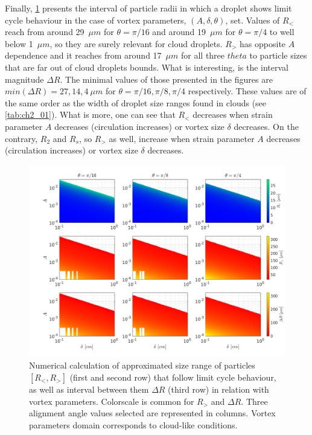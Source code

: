 \documentclass[../main.tex]{subfiles}
\begin{document}
Finally, \ref{fig:ch4_6} presents the interval of particle radii in which a droplet shows limit cycle behaviour in the case of vortex parameters, $(A, \delta, \theta)$, set. Values of $R_<$  reach from around 29~$\mu m$ for $\theta=\pi/16$ and around 19~$\mu m$ for $\theta=\pi/4$ to well below 1~$\mu m$, so they are surely relevant for cloud droplets. $R_>$ has opposite $A$ dependence and it reaches from around 17~$\mu m$ for all three $theta$ to particle sizes that are far out of cloud droplets bounds. What is interesting, is the interval magnitude $\Delta R$. The minimal values of those presented in the figures are $min(\Delta R)=27, 14, 4 \ \mu m$ for $\theta=\pi/16, \pi/8, \pi/4$ respectively. These values are of the same order as the width of droplet size ranges found in clouds (see \autoref{tab:ch2_01}). What is more, one can see that $R_<$ decreases when strain parameter $A$ decreases (circulation increases) or vortex size $\delta$ decreases. On the contrary, $R_2$ and $R_s$, so $R_>$ as well, increase when strain parameter $A$ decreases (circulation increases) or vortex size $\delta$ decreases.

\begin{figure}[h]
\centering
\noindent\includegraphics[width=35pc]{gfx/RlRrDeltaR.png}
\caption{Numerical calculation of approximated size range of particles $[R_<,R_>]$ (first and second row) that follow limit cycle behaviour, as well as interval between them $\Delta R$ (third row) in relation with vortex parameters. Colorscale is common for $R_>$ and $\Delta R$. Three alignment angle values selected are represented in columns. Vortex parameters domain corresponds to cloud-like conditions.}
\label{fig:ch4_6}
\end{figure}
\end{document}
